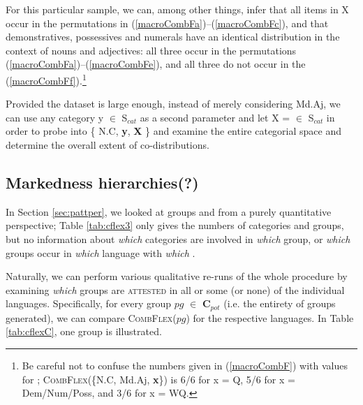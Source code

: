 \documentclass[output=paper,colorlinks,citecolor=brown,draft]{langscibook}
\begin{document}
For this particular sample, we can, among other things, infer that all items in X occur in the permutations in (\ref{macroCombFa})--(\ref{macroCombFc}), and that demonstratives, possessives and numerals have an identical distribution in the context of nouns and adjectives: all three occur in the permutations (\ref{macroCombFa})--(\ref{macroCombFe}), and all three do not occur in the  (\ref{macroCombFf}).\footnote{Be careful not to confuse the numbers given in (\ref{macroCombF})  with values for ; \textsc{CombFlex}(\{N.C, Md.Aj, \textbf{x}\}) is 6/6 for x = Q, 5/6 for x = Dem/Num/Poss, and 3/6 for x = WQ.}  

Provided the dataset is large enough, instead of merely considering  Md.Aj, we can use any category y $\in$ S$_{cat}$ as a second parameter and let X = $\in$ S$_{cat}$ in order to probe into \{ N.C, \textbf{y}, \textbf{ X }\} and examine the entire categorial space and determine the overall extent of co-distributions.  



\subsection{Markedness hierarchies(?)}

In Section \ref{sec:pattper}, we looked at  groups and  from a purely quantitative perspective; Table \ref{tab:cflex3} only gives the numbers of categories and   groups, but no information about \textit{which} categories are involved in \textit{which}  group, or \textit{which}  groups occur in \textit{which} language with \textit{which} . 


Naturally, we can perform various qualitative re-runs of the whole procedure by  examining \textit{which}  groups are \textsc{attested} in all or some (or none) of the individual languages. 
Specifically, for every  group $pg$ $\in$ \textbf{C$_{pot}$} (i.e. the entirety of  groups generated), we can compare \textsc{CombFlex}($pg$) for the respective languages. In Table \ref{tab:cflexC}, one  group is illustrated.
\end{document}
